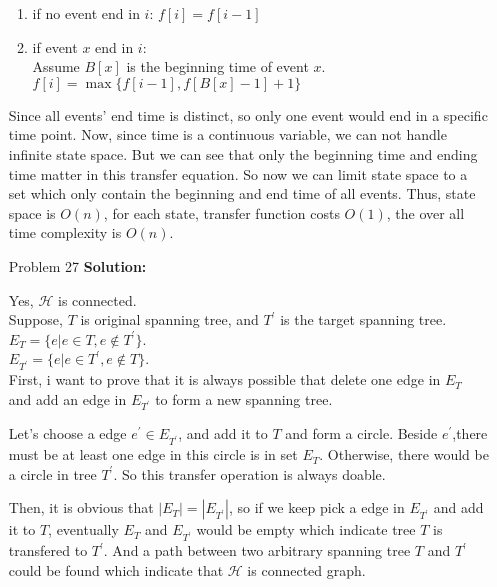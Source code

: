 \normalfont\documentclass[letterpaper,11pt]{article}
\begin{document}
\begin{enumerate}
\begin{enumerate}
		\item if no event end in $i$: $f[i] = f[i-1]$
		\item if event $x$ end in $i$:\\
			Assume $B[x]$ is the beginning time of event $x$.\\
			$f[i] = \max\{f[i-1], f[B[x] - 1] + 1\}$
	\end{enumerate}
			Since all events' end time is distinct, so only one event would end in a specific time point.
			Now, since time is a continuous variable, we can not handle infinite state space. But we can see that only the beginning time and ending time matter in this transfer equation. So now we can limit state space to a set which only contain the beginning and end time of all events.
			Thus, state space is $O(n)$, for each state, transfer function costs $O(1)$, the over all time complexity is $O(n)$.
	
\item [Problem 27]\textbf{Solution:}\par
Yes, $\mathcal{H}$ is connected.\\
Suppose, $T$ is original spanning tree, and $T^\prime$ is the target spanning tree. \\
$E_T = \{e| e \in T, e \not\in T^\prime\}$.\\
$E_{T^\prime} = \{e| e \in T^\prime, e \not\in T\}$.\\
First, i want to prove that it is always possible that delete one edge in $E_T$ and add an edge in $E_{T^\prime}$ to form a new spanning tree.\par
Let's choose a edge $e^\prime \in E_{T^\prime}$, and add it to $T$ and form a circle. Beside $e^\prime$,there must be at least one edge in this circle is in set $E_T$. Otherwise, there would be a circle in tree $T^\prime$. So this transfer operation is always doable.\par
Then, it is obvious that $|E_T| = |E_{T^\prime}|$, so if we keep pick a edge in $E_{T^\prime}$ and add it to $T$, eventually $E_T$ and $E_{T^\prime}$ would be empty which indicate tree $T$ is transfered to $T^\prime$. And a path between two arbitrary spanning tree $T$ and $T^\prime$ could be found which indicate that $\mathcal{H}$ is connected graph.

\end{enumerate}
\end{document}

